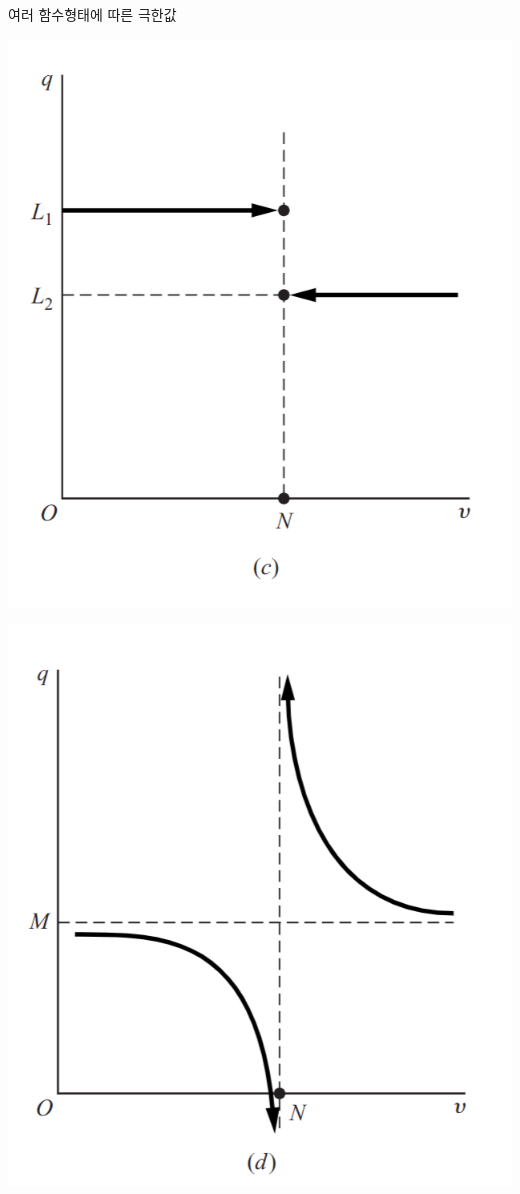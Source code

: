\documentclass[aspectratio=169]{beamer}
\begin{document}
\begin{frame}{여러 함수형태에 따른 극한값}
  \begin{minipage}[t]{0.48\textwidth}
    \centering
    \includegraphics[width=\linewidth,height=0.48\textheight,keepaspectratio]{fig/limits_illustration_c.png}
  \end{minipage}
  \hfill
  \begin{minipage}[t]{0.48\textwidth}
    \centering
    \includegraphics[width=\linewidth,height=0.48\textheight,keepaspectratio]{fig/limits_illustration_d.png}
  \end{minipage}


\end{frame}
\end{document}
